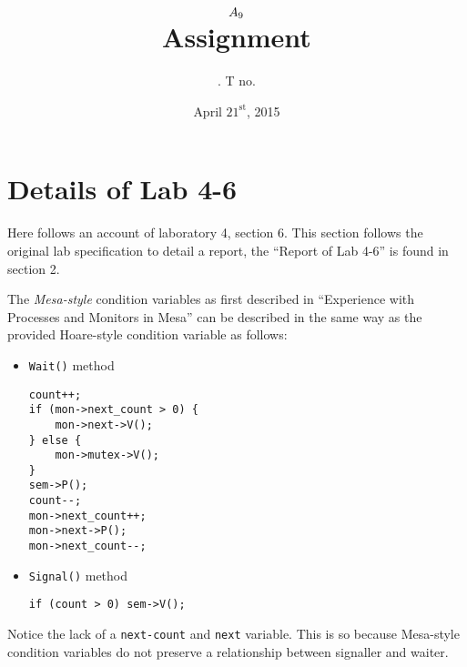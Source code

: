 \documentclass[11pt]{article}
\title{
    $A_{9}$ \\
    {\large Assignment \rom{\hw}}
}
\author{
    \name. T no. \tno
}
\date{April $21^{\text{st}}$, 2015}
\begin{document}
\maketitle

\section{Details of Lab 4-6}

Here follows an account of laboratory 4, section 6. This section follows the original lab specification to detail a report, the ``Report of Lab 4-6'' is found in section 2.

\begin{question}

    The {\it Mesa-style} condition variables as first described in ``Experience with Processes and Monitors in Mesa'' can be described in the same way as the provided Hoare-style condition variable as follows:

    \begin{itemize}
        \item{
            {\tt Wait()} method
            \begin{verbatim}
count++;
if (mon->next_count > 0) {
    mon->next->V();
} else {
    mon->mutex->V();
}
sem->P();
count--;
mon->next_count++;
mon->next->P();
mon->next_count--;
            \end{verbatim}
        }
        \item{
            {\tt Signal()} method
            \begin{verbatim}
if (count > 0) sem->V();
            \end{verbatim}
        }
    \end{itemize}

    Notice the lack of a {\tt next-count} and {\tt next} variable. This is so because Mesa-style condition variables do not preserve a relationship between signaller and waiter.

\end{question}
\end{document}
